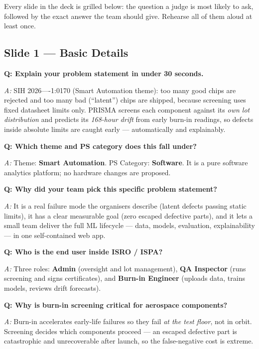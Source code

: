 \documentclass[11pt,a4paper]{article}
\begin{document}
\noindent Every slide in the deck is grilled below: the question a judge is most likely to ask,
followed by the exact answer the team should give. Rehearse all of them aloud at least once.

\newcommand{\qa}[2]{%
  \par\vspace{0.9em}\noindent\textbf{\color{accent}Q: #1}\par\vspace{0.2em}
  \noindent\textit{A:} #2\par
}

\subsection{Slide 1 --- Basic Details}

\qa{Explain your problem statement in under 30 seconds.}{
  SIH 2026----1:0170 (Smart Automation theme): too many good chips are rejected and too many
  bad (``latent'') chips are shipped, because screening uses fixed datasheet limits only.
  PRISMA screens each component against its \emph{own lot distribution} and predicts its
  \emph{168-hour drift} from early burn-in readings, so defects inside absolute limits are
  caught early --- automatically and explainably.
}

\qa{Which theme and PS category does this fall under?}{
  Theme: \textbf{Smart Automation}. PS Category: \textbf{Software}. It is a pure software
  analytics platform; no hardware changes are proposed.
}

\qa{Why did your team pick this specific problem statement?}{
  It is a real failure mode the organisers describe (latent defects passing static limits),
  it has a clear measurable goal (zero escaped defective parts), and it lets a small team
  deliver the full ML lifecycle --- data, models, evaluation, explainability --- in one
  self-contained web app.
}

\qa{Who is the end user inside ISRO / ISPA?}{
  Three roles: \textbf{Admin} (oversight and lot management), \textbf{QA Inspector}
  (runs screening and signs certificates), and \textbf{Burn-in Engineer} (uploads data,
  trains models, reviews drift forecasts).
}

\qa{Why is burn-in screening critical for aerospace components?}{
  Burn-in accelerates early-life failures so they fail \emph{at the test floor}, not in
  orbit. Screening decides which components proceed --- an escaped defective part is
  catastrophic and unrecoverable after launch, so the false-negative cost is extreme.
}
\end{document}
